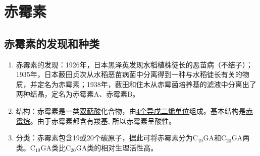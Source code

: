 \section{赤霉素}
\subsection{赤霉素的发现和种类}
\begin{enumerate}
    \item 赤霉素的发现：1926年，日本黑泽英发现水稻植株徒长的恶苗病（不结子）；1935年，日本薮田贞次从水稻恶苗病菌中分离得到一种与水稻徒长有关的物质，并定名为赤霉素；1938年，薮田和住木从赤霉菌培养基的滤液中分离出了两种结晶，定名为赤霉素A、赤霉素B。    
    \item 结构：赤霉素是一类\uline{双萜酸}化合物，由\uline{4个异戊二烯单位}组成。基本结构是\uline{赤霉烷}。由于赤霉素都含有羧基, 所以赤霉素呈酸性。
    \item 分类：赤霉素包含19或20个碳原子，据此可将赤霉素分为C$_{19}$GA和C$_{20}$GA两类。C$_{19}$GA类比C$_{20}$GA类的相对生理活性高。
\end{enumerate}
